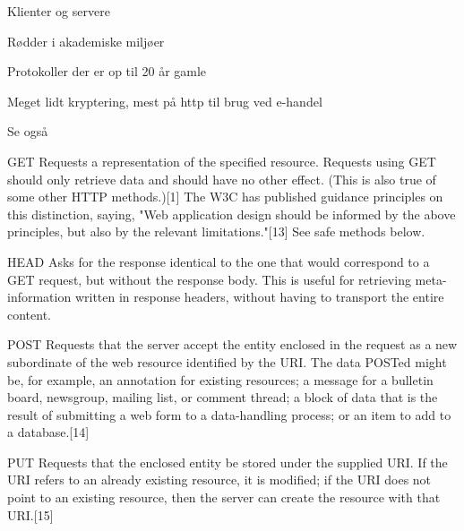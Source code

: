 \documentclass[20pt,landscape,a4paper,footrule]{foils}
\begin{document}


\begin{list1}
\item Klienter og servere
\item Rødder i akademiske miljøer
\item Protokoller der er op til 20 år gamle
\item Meget lidt kryptering, mest på http til brug ved e-handel
\end{list1}





Se også 


\begin{list2}
\item [GET]
Requests a representation of the specified resource. Requests using GET should only retrieve data and should have no other effect. (This is also true of some other HTTP methods.)[1] The W3C has published guidance principles on this distinction, saying, "Web application design should be informed by the above principles, but also by the relevant limitations."[13] See safe methods below.
\item [HEAD]
Asks for the response identical to the one that would correspond to a GET request, but without the response body. This is useful for retrieving meta-information written in response headers, without having to transport the entire content.
\item [POST]
Requests that the server accept the entity enclosed in the request as a new subordinate of the web resource identified by the URI. The data POSTed might be, for example, an annotation for existing resources; a message for a bulletin board, newsgroup, mailing list, or comment thread; a block of data that is the result of submitting a web form to a data-handling process; or an item to add to a database.[14]
\item [PUT]
Requests that the enclosed entity be stored under the supplied URI. If the URI refers to an already existing resource, it is modified; if the URI does not point to an existing resource, then the server can create the resource with that URI.[15]
\end{list2}
\end{document}
